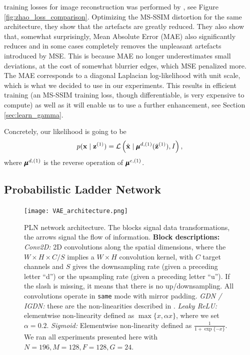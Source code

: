 training losses for image reconstruction was performed by
\cite{zhao2015loss}, see Figure \ref{fig:zhao_loss_comparison}. Optimizing the
MS-SSIM distortion for the same architecture, they show that the artefacts are
greatly reduced. They also show that, somewhat surprisingly, Mean Absolute Error
(MAE) also significantly reduces and in some cases completely removes the
unpleasant artefacts introduced by MSE.
This is because MAE no longer underestimates small deviations, at the cost of
somewhat blurrier edges, which MSE penalized more. The MAE corresponds to a
diagonal Laplacian log-likelihood with unit scale, which is what we decided to
use in our experiments. This results in efficient training (an MS-SSIM
training loss, though differentiable, is very expensive to compute) as well as
it will enable us to use a further enhancement, see Section
\ref{sec:learn_gamma}.

Concretely, our likelihood is going to be
\begin{equation}
\label{eq:laplace_likelihood}
  p(\mathbf{x} \mid \mathbf{z}^{(1)}) = \mathcal{L}\left( \hat{\mathbf{x}} \mid
  \pmb{\mu}^{d, (1)}(\tilde{\mathbf{z}}^{(1)}), I \right),
\end{equation}
where $\pmb{\mu}^{d, (1)}$ is the reverse operation of $\pmb{\mu}^{e, (1)}$.


\subsection{Probabilistic Ladder Network}
\label{sec:prob_ladder_networks}

\begin{figure}
  \centering
  \texttt{[image: VAE\_architecture.png]}
  \caption[Our Probabilistic Ladder Network (PLNl) architecture.]
  {PLN network architecture. The blocks signal data transformations, the
    arrows signal the flow of information. \textbf{Block descriptions:}
    \textit{Conv2D:} 2D convolutions along the spatial dimensions, where the
    $W\times H \times C / S$ implies a $W \times H$ convolution kernel, with $C$
  target channels and $S$ gives the downsampling rate (given a preceding letter
  ``d'') or the upsampling rate (given a preceding letter ``u''). If the slash
  is missing, it means that there is no up/downsampling. All convolutions operate
  in \texttt{same} mode with mirror padding. \textit{GDN / IGDN:} these are the
  non-linearities described in \cite{balle2016end}. \textit{Leaky ReLU:}
  elementwise non-linearity defined as $\max\{x, \alpha x\}$, where we set
  $\alpha=0.2$. \textit{Sigmoid:} Elementwise non-linearity defined as
  $\frac{1}{1 + \exp\{-x\}}$. We ran all
  experiments presented here with $N = 196, M = 128, F = 128, G = 24$.}
  \label{fig:pln_architecture}
\end{figure}

